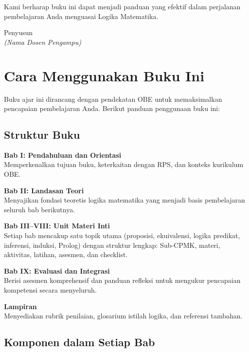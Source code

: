 Kami berharap buku ini dapat menjadi panduan yang efektif dalam perjalanan pembelajaran Anda menguasai Logika Matematika.

\vspace{1cm}
\begin{flushright}
Penyusun\\
\textit{(Nama Dosen Pengampu)}
\end{flushright}

\cleardoublepage

\chapter*{Cara Menggunakan Buku Ini}

Buku ajar ini dirancang dengan pendekatan OBE untuk memaksimalkan pencapaian pembelajaran Anda. Berikut panduan penggunaan buku ini:

\section*{Struktur Buku}

\textbf{Bab I: Pendahuluan dan Orientasi}\\
Memperkenalkan tujuan buku, keterkaitan dengan RPS, dan konteks kurikulum OBE.

\textbf{Bab II: Landasan Teori}\\
Menyajikan fondasi teoretis logika matematika yang menjadi basis pembelajaran seluruh bab berikutnya.

\textbf{Bab III--VIII: Unit Materi Inti}\\
Setiap bab mencakup satu topik utama (proposisi, ekuivalensi, logika predikat, inferensi, induksi, Prolog) dengan struktur lengkap: Sub-CPMK, materi, aktivitas, latihan, asesmen, dan checklist.

\textbf{Bab IX: Evaluasi dan Integrasi}\\
Berisi asesmen komprehensif dan panduan refleksi untuk mengukur pencapaian kompetensi secara menyeluruh.

\textbf{Lampiran}\\
Menyediakan rubrik penilaian, glosarium istilah logika, dan referensi tambahan.

\section*{Komponen dalam Setiap Bab}

